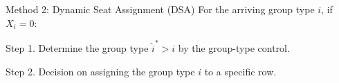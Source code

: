   
  

    
    \begin{frame}{Method 2: Dynamic Seat Assignment (DSA)}
      For the arriving group type $i$, if $X_i =0$:

      \vspace{0.5cm}

      Step 1. Determine the group type $\hat{i}^{*}> i$ by the group-type control.

      \vspace{0.5cm}

      Step 2. Decision on assigning the group type $i$ to a specific row.

        


    \end{frame}


